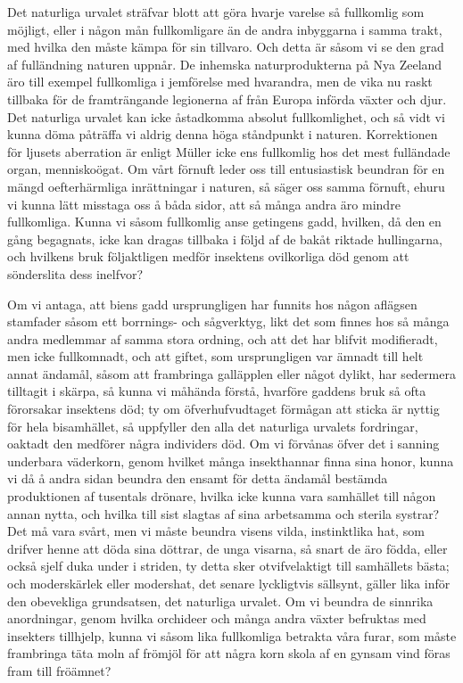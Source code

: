 Det naturliga urvalet sträfvar blott att göra hvarje varelse så fullkomlig som möjligt, eller i någon mån fullkomligare än de andra inbyggarna i samma trakt, med hvilka den måste kämpa för sin tillvaro. Och detta är såsom vi se den grad af fulländning naturen uppnår. De inhemska naturprodukterna på Nya Zeeland äro till exempel fullkomliga i jemförelse med hvarandra, men de vika nu raskt tillbaka för de framträngande legionerna af från Europa införda växter och djur. Det naturliga urvalet kan icke åstadkomma absolut fullkomlighet, och så vidt vi kunna döma påträffa vi aldrig denna höga ståndpunkt i naturen. Korrektionen för ljusets aberration är enligt Müller icke ens fullkomlig hos det mest fulländade organ, menniskoögat. Om vårt förnuft leder oss till entusiastisk beundran för en mängd oefterhärmliga inrättningar i naturen, så säger oss samma förnuft, ehuru vi kunna lätt misstaga oss å båda sidor, att så många andra äro mindre fullkomliga. Kunna vi såsom fullkomlig anse getingens gadd, hvilken, då den en gång begagnats, icke kan dragas tillbaka i följd af de bakåt riktade hullingarna, och hvilkens bruk följaktligen medför insektens ovilkorliga död genom att sönderslita dess inelfvor?

Om vi antaga, att biens gadd ursprungligen har funnits hos någon aflägsen stamfader såsom ett borrnings- och sågverktyg, likt det som finnes hos så många andra medlemmar af samma stora ordning, och att det har blifvit modifieradt, men icke fullkomnadt, och att giftet, som ursprungligen var ämnadt till helt annat ändamål, såsom att frambringa galläpplen eller något dylikt, har sedermera tilltagit i skärpa, så kunna vi måhända förstå, hvarföre gaddens bruk så ofta förorsakar insektens död; ty om öfverhufvudtaget förmågan att sticka är nyttig för hela bisamhället, så uppfyller den alla det naturliga urvalets fordringar, oaktadt den medförer några individers död. Om vi förvånas öfver det i sanning underbara väderkorn, genom hvilket många insekthannar finna sina honor, kunna vi då å andra sidan beundra den ensamt för detta ändamål bestämda produktionen af tusentals drönare, hvilka icke kunna vara samhället till någon annan nytta, och hvilka till sist slagtas af sina arbetsamma och sterila systrar? Det må vara svårt, men vi måste beundra visens vilda, instinktlika hat, som drifver henne att döda sina döttrar, de unga visarna, så snart de äro födda, eller också sjelf duka under i striden, ty detta sker otvifvelaktigt till samhällets bästa; och moderskärlek eller modershat, det senare lyckligtvis sällsynt, gäller lika inför den obevekliga grundsatsen, det naturliga urvalet. Om vi beundra de sinnrika anordningar, genom hvilka orchideer och många andra växter befruktas med insekters tillhjelp, kunna vi såsom lika fullkomliga betrakta våra furar, som måste frambringa täta moln af frömjöl för att några korn skola af en gynsam vind föras fram till fröämnet?



